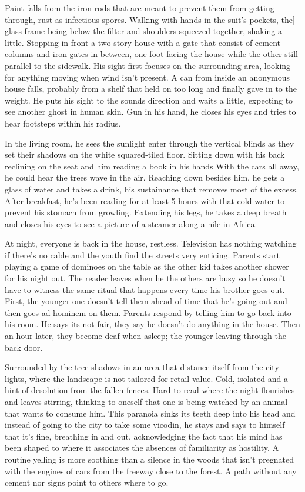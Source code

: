 \begin{Document}
       Paint falls from the iron rods that are meant to prevent them from getting through, rust as infectious spores. Walking with hands in the suit's pockets, the]
    glass frame being below the filter and shoulders squeezed together, shaking a little. Stopping in front a two story house with a gate that consist of cement
    columns and iron gates in between, one foot facing the house while the other still parallel to the sidewalk. His sight first focuses on the surrounding area,
    looking for anything moving when wind isn't present. A can from inside an anonymous house falls, probably from a shelf that held on too long and finally
    gave in to the weight. He puts his sight to the sounds direction and waits a little, expecting to see another ghost in human skin. Gun in his hand, he closes
    his eyes and tries to hear footsteps within his radius.

       In the living room, he sees the sunlight enter through the vertical blinds as they set their shadows on the white squared-tiled floor. Sitting down with his
    back reclining on the seat and him reading a book in his hands  With the cars all away, he could hear the trees wave in the air. Reaching down besides him,
    he gets a glass of water and takes a drink, his sustainance that removes most of the excess. After breakfast, he's been reading for at least 5 hours with
    that cold water to prevent his stomach from growling. Extending his legs, he takes a deep breath and closes his eyes to see a picture of a steamer along
    a nile in Africa.

        At night, everyone is back in the house, restless. Television has nothing watching if there's no cable and the youth find the streets very enticing. 
    Parents start playing a game of dominoes on the table as the other kid takes another shower for his night out. The reader leaves when he the others are
    busy so he doesn't have to witness the same ritual that happens every time his brother goes out. First, the younger one doesn't tell them ahead of time that
    he's going out and then goes ad hominem on them. Parents respond by telling him to go back into his room. He says its not fair, they say he doesn't do anything
    in the house. Then an hour later, they become deaf when asleep; the younger leaving through the back door.

        Surrounded by the tree shadows in an area that distance itself from the city lights, where the landscape is not tailored for retail value. Cold, isolated
    and a hint of desolution from the fallen fences. Hard to read where the night flourishes and leaves stirring, thinking to oneself that one is being watched
    by an animal that wants to consume him. This paranoia sinks its teeth deep into his head and instead of going to the city to take some vicodin, he stays and
    says to himself that it's fine, breathing in and out, acknowledging the fact that his mind has been shaped to where it associates the absences of familiarity
    as hostility. A routine yelling is more soothing than a silence in the woods that isn't pregnated with the engines of cars from the freeway close to the
    forest. A path without any cement nor signs point to others where to go.


\end{Document}
